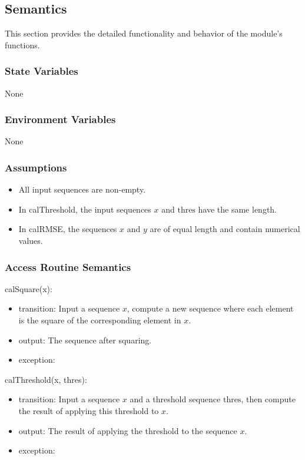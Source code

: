 \documentclass[12pt, titlepage]{article}
\begin{document}
\subsection{Semantics}

This section provides the detailed functionality and behavior of the module’s
functions.

\subsubsection{State Variables}

None

\subsubsection{Environment Variables}

None

\subsubsection{Assumptions}

\begin{itemize}
\item All input sequences are non-empty.
\item In calThreshold, the input sequences $x$ and $\text{thres}$ have the same
length.
\item In calRMSE, the sequences $x$ and $y$ are of equal length and contain
numerical values.
\end{itemize}

\subsubsection{Access Routine Semantics}

\noindent calSquare(x):
\begin{itemize}
\item transition: Input a sequence $x$, compute a new sequence where each
element is the square of the corresponding element in $x$.
\item output: The sequence after squaring.
\item exception: 
\end{itemize}

\noindent calThreshold(x, thres):
\begin{itemize}
\item transition: Input a sequence $x$ and a threshold sequence $\text{thres}$,
then compute the result of applying this threshold to $x$.
\item output: The result of applying the threshold to the sequence $x$.
\item exception: 
\end{itemize}
\end{document}
